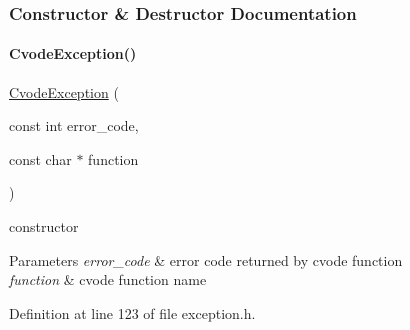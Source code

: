 \subsubsection{Constructor \& Destructor Documentation}
\mbox{\label{classamici_1_1_cvode_exception_ac93a5dc0529238779b716b7a30cf69cb}} 
\paragraph{\texorpdfstring{Cvode\+Exception()}{CvodeException()}}
{\footnotesize\ttfamily \mbox{\hyperlink{classamici_1_1_cvode_exception}{Cvode\+Exception}} (\begin{DoxyParamCaption}\item[{const int}]{error\+\_\+code,  }\item[{const char $\ast$}]{function }\end{DoxyParamCaption})}

constructor 
\begin{DoxyParams}{Parameters}
{\em error\+\_\+code} & error code returned by cvode function \\
\hline
{\em function} & cvode function name \\
\hline
\end{DoxyParams}


Definition at line 123 of file exception.\+h.

